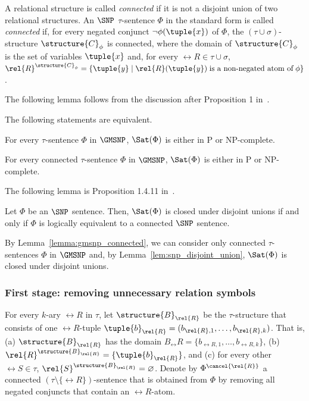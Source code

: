 \documentclass{lmcs}
\begin{document}
A relational structure is called \emph{connected} if it is not a disjoint union of two relational structures.
An $\SNP$ $\tau$-sentence $\Phi$ in the standard form is called \emph{connected} if, for every negated conjunct $\neg\phi(\tuple{x})$ of $\Phi$, the $(\tau\cup\sigma)$-structure $\structure{C}_\phi$ is connected, where the domain of $\structure{C}_\phi$ is the set of variables $\tuple{x}$ and, for every $\rel{R}\in\tau\cup\sigma$, $\rel{R}^{\structure{C}_\phi} = \{\tuple{y}\mid \rel{R}(\tuple{y})\;\text{is a non-negated atom of}\; \phi\}$.

%
The following lemma follows from the discussion after Proposition 1 in~\cite{bodirsky_asnp}.
\begin{lem}\label{lemma:gmsnp_connected} 
The following statements are equivalent.
\begin{compactenum}
\item For every $\tau$-sentence $\Phi$ in $\GMSNP$, $\Sat(\Phi)$ is either in P or NP-complete.
\item For every connected $\tau$-sentence $\Phi$ in $\GMSNP$, $\Sat(\Phi)$ is either in P or NP-complete. 
\end{compactenum}
\end{lem}
The following lemma is Proposition 1.4.11 in~\cite{bodirsky_book}.
\begin{lem}\label{lem:snp_disjoint_union} 
Let $\Phi$ be an $\SNP$ sentence.
Then, $\Sat(\Phi)$ is closed under disjoint unions if and only if $\Phi$ is logically equivalent to a connected $\SNP$ sentence.
\end{lem}
By Lemma~\ref{lemma:gmsnp_connected}, we can consider only connected $\tau$-sentences $\Phi$ in $\GMSNP$ and, by Lemma~\ref{lem:snp_disjoint_union}, $\Sat(\Phi)$ is closed under disjoint unions.

\subsubsection*{First stage: removing unnecessary relation symbols} 
For every $k$-ary $\rel{R}$ in $\tau$, let $\structure{B}_\rel{R}$ be the $\tau$-structure that consists of one $\rel{R}$-tuple $\tuple{b}_\rel{R} = (b_{\rel{R},1},\ldots,b_{\rel{R},k})$. That is, (a) $\structure{B}_\rel{R}$ has the domain $B_\rel{R}=\{b_{\rel{R},1},\ldots,b_{\rel{R},k}\}$, (b) $\rel{R}^{\structure{B}_\rel{R}}=\{\tuple{b}_\rel{R}\}$, and (c) for every other $\rel{S}\in\tau$, $\rel{S}^{\structure{B}_\rel{R}}=\varnothing$.
Denote by $\Phi^{\cancel{\rel{R}}}$ a connected $(\tau\setminus\{\rel{R}\})$-sentence that is obtained from $\Phi$ by removing all negated conjuncts that contain an $\rel{R}$-atom.
\end{document}
